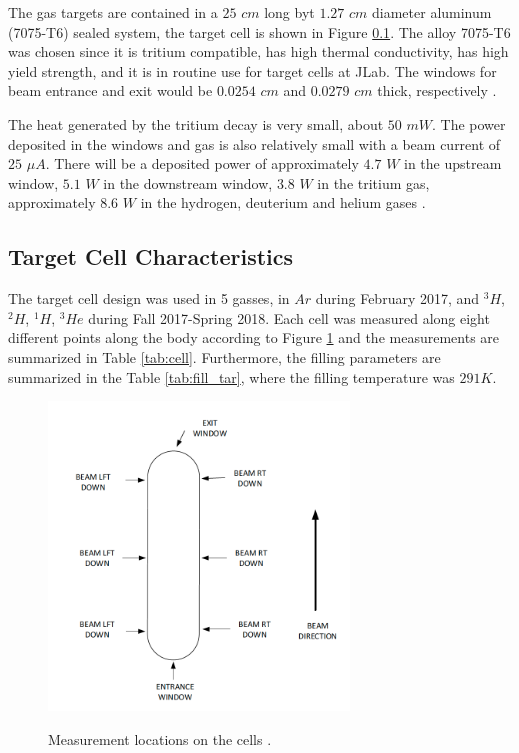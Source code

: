 \documentclass[final,5p,times,twocolumn]{elsarticle}
\begin{document}
The gas targets are contained in a $25$ $cm$ long byt $1.27$ $cm$ diameter aluminum (7075-T6) sealed system, the target cell is shown in Figure \ref{}. The alloy 7075-T6 was chosen since it is tritium compatible, has high thermal conductivity, has high yield strength, and it is in routine use for target cells at JLab. The windows for beam entrance and exit would be $0.0254$ $cm$ and $0.0279$ $cm$ thick, respectively \cite{celldes}. 


The heat generated by the tritium decay is very small, about $50$ $mW$. The power deposited in the windows and gas is also relatively small with a beam current of $25$ $\mu A$. There will be a deposited power of approximately $4.7$ $W$ in the upstream window, $5.1$ $W$ in the downstream window, $3.8$ $W$ in the tritium gas, approximately $8.6$ $W$ in the hydrogen, deuterium and helium gases \cite{celldes}. 


\subsection{Target Cell Characteristics}

The target cell design was used in 5 gasses, in $Ar$ during February 2017, and $^{3}H$, $^{2}H$, $^{1}H $, $^{3}He$ during Fall 2017-Spring 2018. Each cell was measured along eight different points along the body according to Figure \ref{fig:cellconfig} and the measurements are summarized in Table \ref{tab:cell}. Furthermore, the filling parameters are summarized in the Table \ref{tab:fill_tar}, where the filling temperature was $291K$.

\begin{figure}
\centering
  \includegraphics[width=8cm]{images/tgt_measurements.png}\\
  \caption{Measurement locations on the cells \cite{cellconfig}. 
 }\label{fig:cellconfig}
\end{figure}
\end{document}
